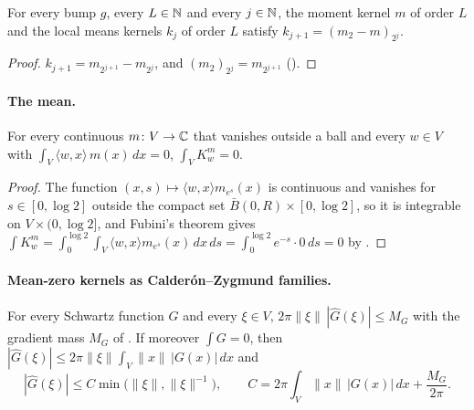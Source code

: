 \begin{lemma}
\label{lem:local-means-kernel-dilation}
\leanok
{}
For every bump $g$, every $L \in \mathbb{N}$ and every $j \in \mathbb{N}$, the moment kernel $m$ of order $L$ and
the local means kernels $k_j$ of order $L$ satisfy $k_{j+1} = (m_2 - m)_{2^j}$.
\end{lemma}

\begin{proof}
\leanok
$k_{j+1} = m_{2^{j+1}} - m_{2^j}$, and $(m_2)_{2^j} = m_{2^{j+1}}$ ().
\end{proof}

\paragraph{The mean.}

\begin{lemma}
\label{lem:divergence-kernel-mean}
\leanok
{}
For every continuous $m \colon V \to \mathbb{C}$ that vanishes outside a ball and every $w \in V$ with
$\int_V \langle w, x \rangle \, m(x) \, dx = 0$, $\int_V K^m_w = 0$.
\end{lemma}

\begin{proof}
\leanok
The function $(x, s) \mapsto \langle w, x \rangle m_{e^s}(x)$ is continuous and vanishes for
$s \in [0, \log 2]$ outside the compact set $\bar B(0, R) \times [0, \log 2]$, so it is
integrable on
$V \times (0, \log 2]$, and Fubini's theorem gives
$\int K^m_w = \int_0^{\log 2} \int_V \langle w, x \rangle m_{e^s}(x) \, dx \, ds
= \int_0^{\log 2} e^{-s} \cdot 0 \, ds = 0$ by .
\end{proof}

\paragraph{Mean-zero kernels as Calder\'on--Zygmund families.}

\begin{lemma}
\label{lem:mean-zero-fourier}
\leanok
{}
For every Schwartz function $G$ and every $\xi \in V$,
$2 \pi \|\xi\| \, |\widehat G(\xi)| \leq M_G$ with the gradient mass $M_G$ of
. If moreover $\int G = 0$, then
$|\widehat G(\xi)| \leq 2 \pi \|\xi\| \int_V \|x\| \, |G(x)| \, dx$ and
\[
  |\widehat G(\xi)| \leq C \min\bigl(\|\xi\|, \|\xi\|^{-1}\bigr), \qquad
  C = 2 \pi \int_V \|x\| \, |G(x)| \, dx + \frac{M_G}{2 \pi} .
\]
\end{lemma}

